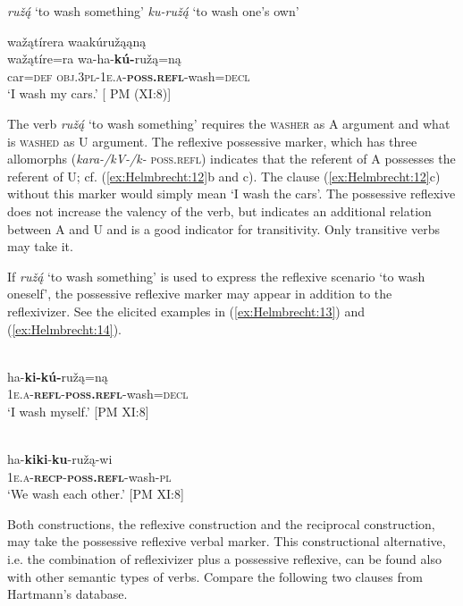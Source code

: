 \documentclass[output=paper]{langscibook}
\begin{document}
\ea  \label{ex:Helmbrecht:12}
	\ea  \textit{ ruž\'{ą}}  {}`to wash something'
	\ex \textit{  ku-ruž\'{ą}  }  {}`to wash one's own'
	\ex  
	
	\glll wažątírera waakúružąąną\\
	  {wažątíre=ra} {wa-ha-\textbf{kú-}ružą=ną}\\
   {car=\textsc{def}}   {\textsc{obj.3\textsc{pl}-1e.a}-\textbf{\textsc{poss.refl}}-wash=\textsc{decl}}\\
	\glt `I wash my cars.' [ PM (XI:8)]
	 \z 
	\z  

The verb \textit{ruž\'{ą}} `to wash something' requires the \textsc{washer} as A argument and what is \textsc{washed} as U argument. The reflexive possessive marker, which has three allomorphs (\textit{kara-/kV-/k-} \textsc{poss.refl}) indicates that the referent of A possesses the referent of U; cf. (\ref{ex:Helmbrecht:12}b and c). The clause (\ref{ex:Helmbrecht:12}c) without this marker would simply mean `I wash the cars'. The possessive reflexive does not increase the valency of the verb, but indicates an additional relation between A and U and is a good indicator for transitivity. Only transitive verbs may take it.

If \textit{ruž\'{ą}} `to wash something' is used to express the reflexive scenario `to wash oneself', the possessive reflexive marker may appear in addition to the reflexivizer. See the elicited examples in (\ref{ex:Helmbrecht:13}) and (\ref{ex:Helmbrecht:14}).

\ea  \label{ex:Helmbrecht:13} 
 \\
       {ha-\textbf{ki-}\textbf{kú-}ružą=ną}\\
	  {\textsc{1e.a}-\textbf{\textsc{refl}}-\textbf{\textsc{poss.refl}}-wash=\textsc{decl}}\\
 \glt `I wash myself.' [PM XI:8]
\z 

\ea \label{ex:Helmbrecht:14} 
    \\
  {ha-\textbf{kiki}-\textbf{ku}-ružą-wi}\\
  {\textsc{1e.a}-\textbf{\textsc{recp}}-\textbf{\textsc{poss.refl}}-wash-\textsc{pl}}\\
  \glt `We wash each other.' [PM XI:8]
\z 

Both constructions, the reflexive construction and the reciprocal construction, may take the possessive reflexive verbal marker. This constructional alternative, i.e. the combination of reflexivizer plus a possessive reflexive, can be found also with other semantic types of verbs. Compare the following two clauses from Hartmann's database. 
\end{document}
